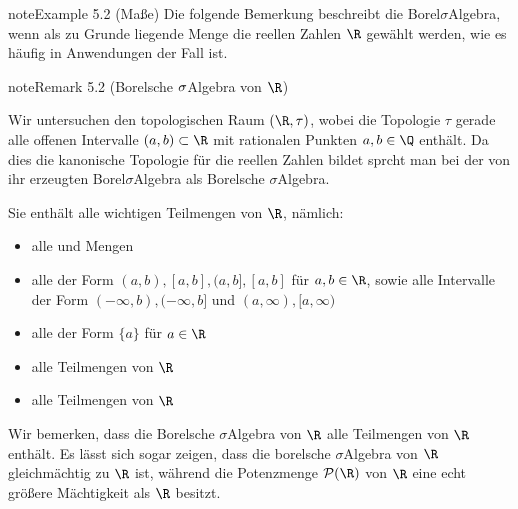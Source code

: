 \documentclass[letterpaper,10pt,english]{jupyterBook}
\begin{document}
\begin{sphinxadmonition}{note}{Example 5.2 (Maße)}
\sphinxAtStartPar
Die folgende Bemerkung beschreibt die Borel\sphinxhyphen{}\(\sigma\)\sphinxhyphen{}Algebra, wenn als zu Grunde liegende Menge die reellen Zahlen \(\R\) gewählt werden, wie es häufig in Anwendungen der Fall ist.
\label{masstheorie/masstheorie:remark-8}
\begin{sphinxadmonition}{note}{Remark 5.2 (Borelsche \protect\(\sigma\protect\)\sphinxhyphen{}Algebra von \protect\(\R\protect\))}



\sphinxAtStartPar
Wir untersuchen den topologischen Raum \((\R, \tau)\), wobei die Topologie \(\tau\) gerade alle offenen Intervalle \((a,b) \subset \R\) mit rationalen Punkten \(a,b \in \Q\) enthält.
Da dies die kanonische Topologie für die reellen Zahlen bildet sprcht man bei der von ihr erzeugten Borel\sphinxhyphen{}\(\sigma\)\sphinxhyphen{}Algebra als  Borelsche \(\sigma\)\sphinxhyphen{}Algebra.

\sphinxAtStartPar
Sie enthält alle wichtigen Teilmengen von \(\R\), nämlich:
\begin{itemize}
\item {} 
\sphinxAtStartPar
alle  und  Mengen

\item {} 
\sphinxAtStartPar
alle  der Form \((a,b), [a,b], (a,b], [a,b]\) für \(a,b \in \R\), sowie alle Intervalle der Form \((-\infty, b), (-\infty, b]\) und \((a, \infty), [a,\infty)\)

\item {} 
\sphinxAtStartPar
alle  der Form \(\{a\}\) für \(a \in \R\)

\item {} 
\sphinxAtStartPar
alle  Teilmengen von \(\R\)

\item {} 
\sphinxAtStartPar
alle  Teilmengen von \(\R\)

\end{itemize}

\sphinxAtStartPar
Wir bemerken, dass die Borelsche \(\sigma\)\sphinxhyphen{}Algebra von \(\R\)  alle Teilmengen von \(\R\) enthält.
Es lässt sich sogar zeigen, dass die borelsche \(\sigma\)\sphinxhyphen{}Algebra von \(\R\) gleichmächtig zu \(\R\) ist, während die Potenzmenge \(\mathcal{P}(\R)\) von \(\R\) eine echt größere Mächtigkeit als \(\R\) besitzt.
\end{sphinxadmonition}


\end{sphinxadmonition}
\end{document}
